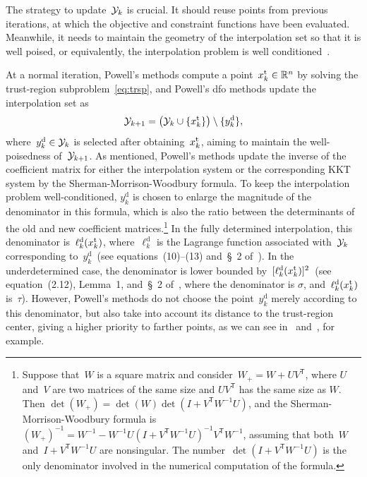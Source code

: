 \documentclass[manuscript,screen,review]{acmart}
\numberwithin{equation}{section}
\newcommand*{\R}{\mathbb{R}}
\newcommand*{\T}{\mathsf{T}}
\newcommand*{\drop}{{\text{d}}}
\newcommand*{\iter}[1][k]{x\ifthenelse{\equal{#1}{}}{}{_{#1}}}
\newcommand*{\kkt}{KKT\xspace}
\newcommand*{\set}[2][]{#1\{#2#1\}}
\newcommand*{\trust}{{\text{t}}}
\newcommand*{\xpt}[1][k]{\mathcal{Y}\ifthenelse{\equal{#1}{}}{}{_{#1}}}
\begin{document}
The strategy to update~$\xpt$ is crucial.
It should reuse points from previous iterations, at which the objective and constraint functions have been evaluated.
Meanwhile, it needs to maintain the geometry of the interpolation set so that it is well poised, or equivalently, the interpolation problem is well conditioned~\cite{Conn_Scheinberg_Vicente_2009b}.

At a normal iteration, Powell's methods compute a point~$\iter^{\trust} \in \R^n$ by solving the trust-region subproblem~\eqref{eq:trsp}, and Powell's \gls{dfo} methods update the interpolation set as
\begin{equation}
    \label{eq:xpt-update-tr}
    \xpt[k + 1] = \big(\xpt \cup \set{\iter^{\trust}}\big) \setminus \set{y_k^{\drop}},
\end{equation}
where~$y_k^{\drop} \in \xpt$ is selected after obtaining~$\iter^{\trust}$, aiming to maintain the well-poisedness of~$\xpt[k + 1]$.
As mentioned, Powell's methods update the inverse of the coefficient matrix for either the interpolation system or the corresponding \kkt system by the Sherman-Morrison-Woodbury formula.
To keep the interpolation problem well-conditioned, $y_k^{\drop}$ is chosen to enlarge the magnitude of the denominator in this formula, which is also the ratio between the determinants of the old and new coefficient matrices.\footnote{
    Suppose that~$W$ is a square matrix and consider~$W_+ = W + UV^\T$, where $U$ and~$V$ are two matrices of the same size and $UV^\T$ has the same size as $W$.
    Then $\det(W_+) = \det(W)\det(I+V^\T W^{-1}U)$, and the Sherman-Morrison-Woodbury formula is $(W_+)^{-1} = W^{-1} -W^{-1}U(I+V^\T W^{-1}U)^{-1} V^\T W^{-1}$, assuming that both~$W$ and~$I+V^\T W^{-1}U$ are nonsingular.
    The number~$\det(I+V^\T W^{-1}U)$ is the only denominator involved in the numerical computation of the formula.
}
In the fully determined interpolation, this denominator is~$\ell_k^\drop(\iter^{\trust})$, where~$\ell_k^\drop$ is the Lagrange function associated with~$\xpt$ corresponding to~$y_k^\drop$~(see equations~\mbox{(10)--(13)} and~\S~2 of~\cite{Powell_2001}).
In the underdetermined case, the denominator is lower bounded by~$[\ell_k^{\drop}(\iter^{\trust})]^2$~(see equation~(2.12), Lemma~1, and~\S~2 of~\cite{Powell_2004c}, where the denominator is $\sigma$, and~$\ell_k^{\drop}(\iter^{\trust})$ is~$\tau$).
However, Powell's methods do not choose the point~$y_k^\drop$ merely according to this denominator, but also take into account its distance to the trust-region center, giving a higher priority to farther points, as we can see in~\cite[equation~(56)]{Powell_2002} and~\cite[equations~(7.4)--(7.5)]{Powell_2006}, for example.
\end{document}
